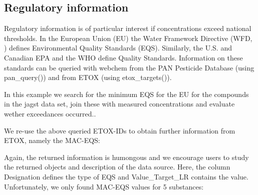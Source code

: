 \newpage
\subsection[Regulatory information]{Regulatory information}
Regulatory information is of particular interest if concentrations exceed national thresholds.
In the European Union (EU) the Water Framework Directive (WFD, \citet{european_union_directive_2000}) defines Environmental Quality Standards (EQS).
Similarly, the U.S. and Canadian EPA and the WHO define Quality Standards.
Information on these standards can be queried with webchem from the PAN Pesticide Database (using pan\_query()) and from ETOX (using etox\_targets()).

In this example we search for the minimum EQS for the EU for the compounds in the jagst data set, join these with measured concentrations and evaluate wether exceedances occurred..

We re-use the above queried ETOX-IDs to obtain further information from ETOX, namely the MAC-EQS:

\newpage
\begin{knitrout}
\color{fgcolor}\begin{kframe}
\begin{alltt}
 \hlkwb{<-} \hlopt{$}
\hlopt{$} \hlkwb{<-}  \hlstd{(}\hlstd{)\{}
   \hlstd{(} \hlopt{==}  \hlopt{&&} 
    \hlstd{(}\hlstd{)}
  \hlstd{\}}  \hlstd{\{}
     \hlkwb{<-} \hlopt{$}
    \hlstd{(res[res}\hlopt{$} \hlopt{==}  \hlopt{&}
              \hlopt{$} \hlopt{==} \hlstd{,} \hlstd{])}
  \hlstd{\}}
\hlstd{\})}
\end{alltt}
\end{kframe}
\end{knitrout}

Again, the returned information is humongous and we encourage users to study the returned objects and description of the data source.
Here, the column Designation defines the type of EQS and Value\_Target\_LR contains the value.
Unfortunately, we only found MAC-EQS values for 5 substances:

